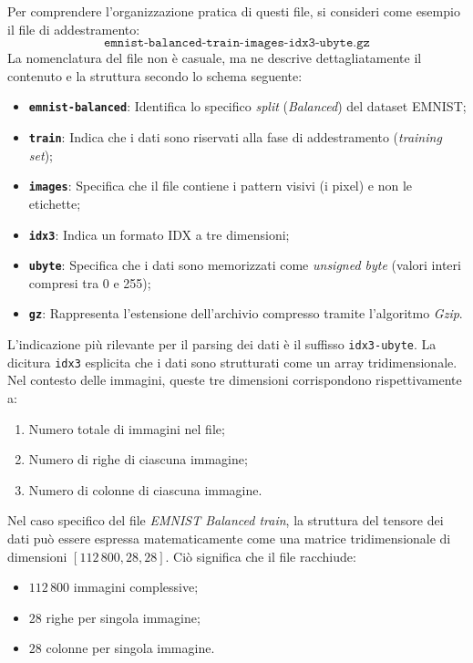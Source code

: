 \documentclass[12pt,a4paper]{article}
\begin{document}
	Per comprendere l'organizzazione pratica di questi file, si consideri come esempio il file di addestramento:$$\texttt{emnist-balanced-train-images-idx3-ubyte.gz}$$La nomenclatura del file non è casuale, ma ne descrive dettagliatamente il contenuto e la struttura secondo lo schema seguente:
	\begin{itemize}
		\item \textbf{\texttt{emnist-balanced}}: Identifica lo specifico \textit{split} (\textit{Balanced}) del dataset EMNIST;
		\item \textbf{\texttt{train}}: Indica che i dati sono riservati alla fase di addestramento (\textit{training set});
		\item \textbf{\texttt{images}}: Specifica che il file contiene i pattern visivi (i pixel) e non le etichette;
		\item \textbf{\texttt{idx3}}: Indica un formato IDX a tre dimensioni;
		\item \textbf{\texttt{ubyte}}: Specifica che i dati sono memorizzati come \textit{unsigned byte} (valori interi compresi tra 0 e 255);
		\item \textbf{\texttt{gz}}: Rappresenta l'estensione dell'archivio compresso tramite l'algoritmo \textit{Gzip}.
	\end{itemize}

	L'indicazione più rilevante per il parsing dei dati è il suffisso \texttt{idx3-ubyte}. La dicitura \texttt{idx3} esplicita che i dati sono strutturati come un array tridimensionale. Nel contesto delle immagini, queste tre dimensioni corrispondono rispettivamente a:
	\begin{enumerate}
		\item Numero totale di immagini nel file;
		\item Numero di righe di ciascuna immagine;
		\item Numero di colonne di ciascuna immagine.
	\end{enumerate}

	Nel caso specifico del file \textit{EMNIST Balanced train}, la struttura del tensore dei dati può essere espressa matematicamente come una matrice tridimensionale di dimensioni $[112\,800, 28, 28]$. Ciò significa che il file racchiude:
	\begin{itemize}
		\item $112\,800$ immagini complessive;
		\item $28$ righe per singola immagine;
		\item $28$ colonne per singola immagine.
	\end{itemize}
\end{document}
